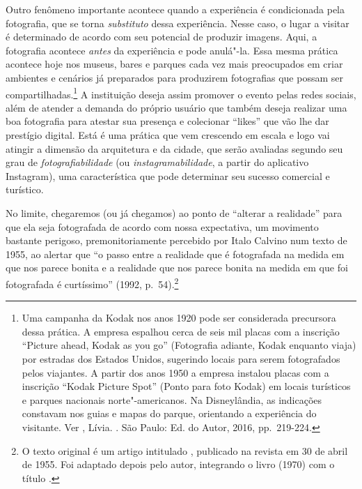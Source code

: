 Outro fenômeno importante acontece quando a experiência é condicionada
pela fotografia, que se torna \emph{substituto} dessa experiência. Nesse
caso, o lugar a visitar é determinado de acordo com seu potencial de
produzir imagens. Aqui, a fotografia acontece \emph{antes} da
experiência e pode anulá"-la. Essa mesma prática acontece hoje nos
museus, bares e parques cada vez mais preocupados em criar ambientes e
cenários já preparados para produzirem fotografias que possam ser
compartilhadas.\footnote{Uma campanha da Kodak nos anos 1920 pode ser
  considerada precursora dessa prática. A empresa espalhou cerca de seis
  mil placas com a inscrição ``Picture ahead, Kodak as you
  go'' (Fotografia adiante, Kodak enquanto viaja) por estradas dos
  Estados Unidos, sugerindo locais para serem fotografados pelos
  viajantes. A partir dos anos 1950 a empresa instalou placas com a
  inscrição ``Kodak Picture Spot'' (Ponto para foto Kodak) em locais
  turísticos e parques nacionais norte"-americanos. Na Disneylândia, as
  indicações constavam nos guias e mapas do parque, orientando a
  experiência do visitante. Ver , Lívia. {}. São Paulo: Ed. do Autor,
  2016, pp.~219-224.} A instituição deseja assim promover o evento pelas
redes sociais, além de atender a demanda do próprio usuário que também
deseja realizar uma boa fotografia para atestar sua presença e
colecionar ``likes'' que vão lhe dar prestígio digital. Está é uma
prática que vem crescendo em escala e logo vai atingir a dimensão da
arquitetura e da cidade, que serão avaliadas segundo seu grau de
\emph{fotografiabilidade} (ou \emph{instagramabilidade}, a partir do
aplicativo Instagram), uma característica que pode determinar seu
sucesso comercial e turístico.

No limite, chegaremos (ou já chegamos) ao ponto de ``alterar a
realidade'' para que ela seja fotografada de acordo com nossa
expectativa, um movimento bastante perigoso, premonitoriamente percebido
por Italo Calvino num texto de 1955, ao alertar que ``o passo entre a
realidade que é fotografada na medida em que nos parece bonita e a
realidade que nos parece bonita na medida em que foi fotografada é
curtíssimo'' (1992, p.~54).\footnote{O texto original é um artigo
  intitulado {}, publicado na revista {} em 30 de abril de 1955. Foi adaptado depois pelo autor,
  integrando o livro {} (1970) com o título {}.}

